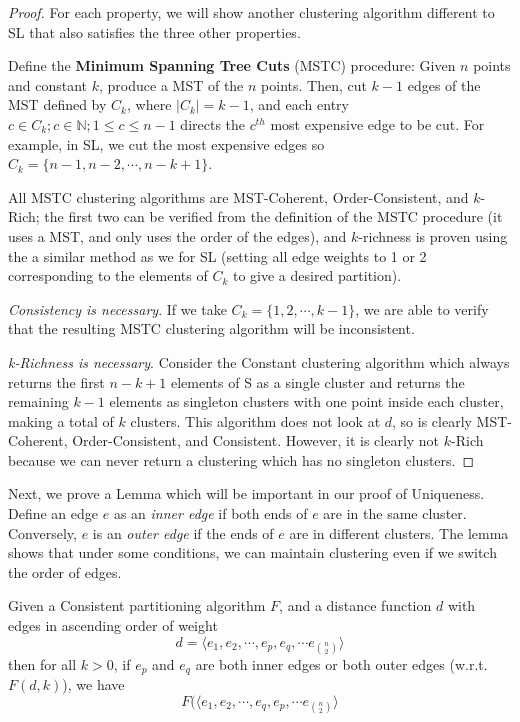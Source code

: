\begin{proof}
    For each property, we will show another clustering algorithm different to SL that also satisfies the three other properties.
    
    Define the \textbf{Minimum Spanning Tree Cuts} (MSTC) procedure: Given $n$ points and constant $k$, produce a MST of the $n$ points. Then, cut $k-1$ edges of the MST defined by $C_k$, where $|C_k| = k-1$, and each entry $c \in C_k; c \in \mathbb{N}; 1 \leq c \leq n-1$ directs the $c^{th}$ most expensive edge to be cut. For example, in SL, we cut the most expensive edges so $C_k = \{n-1, n-2, \cdots, n-k+1\}$.
    
    All MSTC clustering algorithms are MST-Coherent, Order-Consistent, and $k$-Rich; the first two can be verified from the definition of the MSTC procedure (it uses a MST, and only uses the order of the edges), and $k$-richness is proven using the a similar method as we for SL (setting all edge weights to 1 or 2 corresponding to the elements of $C_k$ to give a desired partition).
    
    \textit{Consistency is necessary}. If we take $C_k = \{1, 2, \cdots , k-1\}$, we are able to verify that the resulting MSTC clustering algorithm will be inconsistent.
    
    \textit{k-Richness is necessary}. Consider the Constant clustering algorithm which always returns the first $n-k+1$ elements of S as a single cluster and returns the remaining $k-1$ elements as singleton clusters with one point inside each cluster, making a total of $k$ clusters. This algorithm does not look at $d$, so is clearly MST-Coherent, Order-Consistent, and Consistent. However, it is clearly not $k$-Rich because we can never return a clustering which has no singleton clusters.
    
\end{proof}

Next, we prove a Lemma which will be important in our proof of Uniqueness. Define an edge $e$ as an \textit{inner edge} if both ends of $e$ are in the same cluster. Conversely, $e$ is an \textit{outer edge} if the ends of $e$ are in different clusters. The lemma shows that under some conditions, we can maintain clustering even if we switch the order of edges.

\begin{lemma}
    Given a Consistent partitioning algorithm $F$, and a distance function $d$ with edges in ascending order of weight 
    $$
    d = \langle e_1, e_2, \cdots, e_p, e_q, \cdots e_{\binom{n}{2}} \rangle
    $$
    then for all $k > 0$, if $e_p$ and $e_q$ are both inner edges or both outer edges (w.r.t. $F(d, k)$), we have
    $$
    F(\langle e_1, e_2, \cdots, e_q, e_p, \cdots e_{\binom{n}{2}} \rangle
    $$
\end{lemma}

